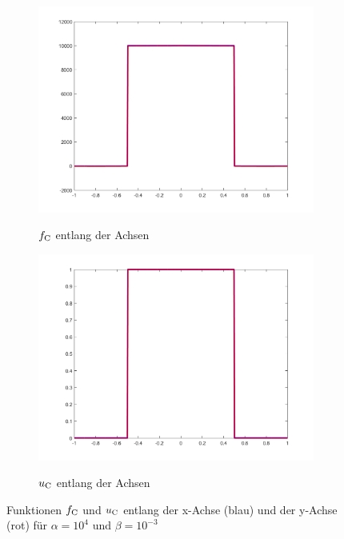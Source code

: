 \begin{figure}[p]
  \centering
  \begin{subfigure}[b]{.48\linewidth}
    \centering
    \caption{$f_\textup{C}$ entlang der Achsen}
    \includegraphics[trim = 40 30 50 20, clip, width=\linewidth]
      {pictures/chapExperiments/secGrayscale/circ/cont/inSiAxis.png}
    \label{fig:circContInSiAxis}
  \end{subfigure}
  \quad
  \begin{subfigure}[b]{.48\linewidth}
    \centering
    \caption{$u_\textup{C}$ entlang der Achsen}
    \includegraphics[trim = 40 30 50 20, clip, width=\linewidth]
      {pictures/chapExperiments/secGrayscale/circ/cont/exactSolutionAxis.png}
    \label{fig:circContExactSolAxis}
  \end{subfigure}
  \caption{Funktionen $f_\textup{C}$ und $u_\textup{C}$ entlang der x-Achse
    (blau) und der y-Achse (rot) für $\alpha = 10^4$ und $\beta = 10^{-3}$}
  \label{fig:circContPlotsAxis}
\end{figure}
